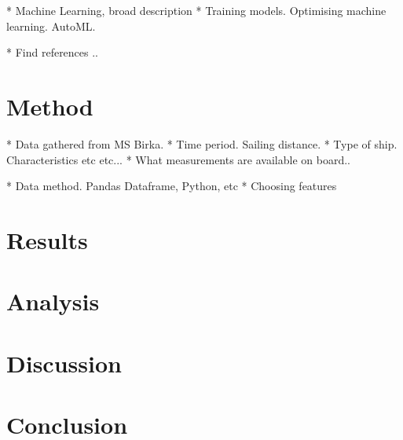 \documentclass[11pt]{article}
\begin{document}
* Machine Learning, broad description
* Training models. Optimising machine learning. AutoML.

* Find references ..


\section{Method}

* Data gathered from MS Birka.
* Time period. Sailing distance.
* Type of ship. Characteristics etc etc...
* What measurements are available on board.. 

* Data method. Pandas Dataframe, Python, etc
* Choosing features


\section{Results}

\section{Analysis}

\section{Discussion}

\section{Conclusion}
\end{document}
